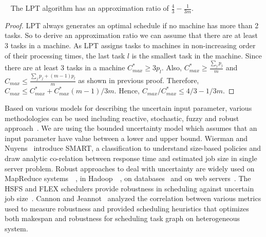    \begin{property}~\cite{Graham69boundson} The LPT algorithm has an approximation ratio of $\frac{4}{3}-\frac{1}{3m}$.
   \end{property}
   \begin{proof}
   LPT always generates an optimal schedule if no machine has more than 2 tasks. So to derive an approximation ratio we can assume that there are at least 3 tasks in a machine.
   As LPT assigns tasks to machines in non-increasing order of their processing times, the last task $l$ is the smallest task in the machine. Since there are at least 3 tasks in a machine $C^*_{max}\geq 3 p_l$.
   Also, $C^*_{max} \geq \frac{\sum_{j}p_j}{m}$ and $C_{max}\leq \frac{\sum_{j}p_j + (m-1)p_l}{m} $ as shown in previous proof. Therefore,  $C_{max} \leq C^*_{max}+C^*_{max}(m-1)/3m $.  Hence, $C_{max}/C^*_{max} \leq 4/3-1/3m$. 
   \end{proof}
 
 Based on various models for describing the uncertain input parameter,
 various methodologies can be used including reactive, stochastic,
 fuzzy and robust approach~\cite{DBLP:journals/cce/LiI08}. We are using
 the bounded uncertainty model which assumes that an input parameter
 have value between a lower and upper bound.  Wierman and
 Nuyens~\cite{conf/sigmetrics/WiermanN08} introduce SMART, a
 classification to understand size-based policies and draw analytic
 co-relation between response time and estimated job size in single
 server problem. Robust approaches to deal with uncertainty are widely
 used on MapReduce
 systems~\cite{Kavulya:2010:ATP:1844765.1845224}~\cite{Verma:2011:AAR:1998582.1998637},
 in
 Hadoop~\cite{Wolf:2010:FSA:2023718.2023720}~\cite{White:2009:HDG:1717298},
 on databases~\cite{Lipton199518} and on web
 servers~\cite{Cardellini99dynamicload}. The HSFS and FLEX schedulers
 provide robustness in scheduling against uncertain job
 size~\cite{Wolf:2010:FSA:2023718.2023720,6691554}. Cannon and
 Jeannot~\cite{cj09c} analyzed the correlation between various metrics
 used to measure robustness and provided scheduling heuristics that
 optimizes both makespan and robustness for scheduling task graph on
 heterogeneous system.
 
